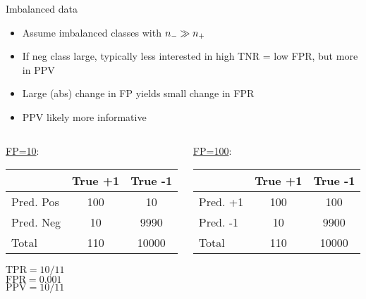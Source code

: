 \documentclass[11pt,compress,t,notes=noshow, xcolor=table]{beamer}
\begin{document}
\begin{vbframe}{Imbalanced data}

\begin{itemize}
     \item Assume imbalanced classes with $n_{-} \gg n_{+}$
     \item If neg class large, typically less interested in high TNR = low FPR,
     but more in PPV
     \item Large (abs) change in FP yields small change in FPR
  \item PPV likely more informative
\end{itemize}

\lz

\begin{columns}
 \begin{column}{0.45\textwidth}
 \underline{FP=10}:\\
 \lz
 {
 \tiny
 \centering
 \tiny
 \begin{tabular}{|l|c|c|}
                 \hline
                & True +1 & True -1 \\ \hline
 Pred. Pos & 100            & 10            \\ \hline
 Pred. Neg & 10            & 9990           \\ \hline
 Total  & 110            & 10000           \\ \hline
 \end{tabular}
 }

 \medskip
 $\text{TPR} = 10/11$\\
 $\text{FPR} = 0.001$\\
 $\text{PPV} = 10/11$
\end{column}
\begin{column}{0.45\textwidth}
 \underline{FP=100}:\\
 \lz
 {
 \tiny
 \begin{tabular}{|l|c|c|}
                 \hline
                & True +1 & True -1 \\ \hline
 Pred. +1 & 100            & 100            \\ \hline
 Pred. -1 & 10            & 9900           \\ \hline
 Total  & 110            & 10000           \\ \hline
 \end{tabular}
 }


\end{column}
\end{columns}
\end{vbframe}
\end{document}
